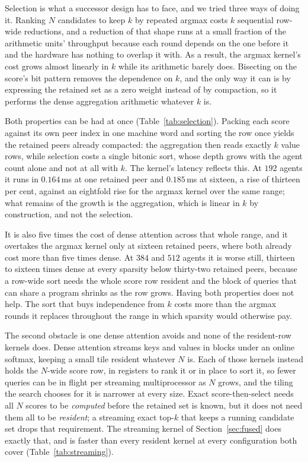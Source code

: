 Selection is what a successor design has to face, and we tried three ways of
doing it. Ranking $N$ candidates to keep $k$ by repeated argmax costs $k$
sequential row-wide reductions, and a reduction of that shape runs at a small
fraction of the arithmetic units' throughput because each round depends on the
one before it and the hardware has nothing to overlap it with. As a result, the
argmax kernel's cost grows almost linearly in $k$ while its arithmetic barely
does. Bisecting on the score's bit pattern removes the dependence on $k$, and
the only way it can is by expressing the retained set as a zero weight instead
of by compaction, so it performs the dense aggregation arithmetic whatever
$k$ is.

Both properties can be had at once (Table~\ref{tab:selection}). Packing each score against its own peer index in
one machine word and sorting the row once yields the retained peers already
compacted: the aggregation then reads exactly $k$ value rows, while selection
costs a single bitonic sort, whose depth grows with the agent count alone and
not at all with $k$. The kernel's latency reflects this. At $192$ agents
it runs in $0.164$\,ms at one retained peer and $0.185$\,ms at sixteen, a rise
of thirteen per cent, against an eightfold rise for the argmax kernel over the
same range; what remains of the growth is the aggregation, which is linear in
$k$ by construction, and not the selection.

It is also five times the cost of dense attention across that whole range, and
it overtakes the argmax kernel only at sixteen retained peers, where both
already cost more than five times dense. At $384$ and $512$ agents it is worse
still, thirteen to sixteen times dense at every sparsity below thirty-two
retained peers, because a row-wide sort needs the whole score row resident and
the block of queries that can share a program shrinks as the row grows. Having
both properties does not help. The sort that buys independence from $k$ costs
more than the argmax rounds it replaces throughout the range in which sparsity
would otherwise pay.

The second obstacle is one dense attention avoids and none of the resident-row
kernels does. Dense attention streams keys and values in blocks under an online softmax,
keeping a small tile resident whatever $N$ is. Each of those kernels
instead holds the $N$-wide score row, in registers to rank it or in place to
sort it, so fewer queries can be in flight per streaming multiprocessor as
$N$ grows, and the tiling the search chooses for it is narrower at every size.
Exact score-then-select needs all $N$ scores to be \emph{computed} before the
retained set is known, but it does not need them all to be \emph{resident}; a
streaming exact top-$k$ that keeps a running candidate set drops that
requirement. The streaming kernel of Section~\ref{sec:fused} does
exactly that, and is faster than every resident kernel at every configuration
both cover (Table~\ref{tab:streaming}).


